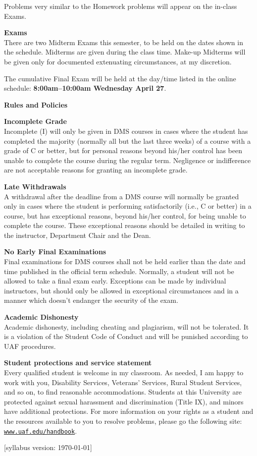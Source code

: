 \documentclass[12pt]{article}
\renewcommand{\emph}[1]{\textsf{\textbf{#1}}}
\newcommand{\localhead}[1]{\par\smallskip\textbf{#1} \smallskip\nobreak\\}%
\def\heading#1{\localhead{\large\emph{#1}}}
\def\subheading#1{\localhead{\emph{#1}}}
\begin{document}
Problems very similar to the Homework problems will appear on the in-class Exams.


\heading{Exams}
There are two Midterm Exams this semester, to be held on the dates shown in the schedule.  Midterms are given during the class time.  Make-up Midterms will be given only for documented extenuating circumstances, at my discretion.

The cumulative Final Exam will be held at the day/time listed in the online schedule: \textbf{8:00am--10:00am Wednesday April 27}.


\heading{Rules and Policies}
\vskip -20pt

\subheading{Incomplete Grade} 
Incomplete (I) will only be given in
  DMS courses in cases where
  the student has completed the majority (normally all but the last
  three weeks) of a course with a grade of C or better, but for
  personal reasons beyond his/her control has been unable to complete
  the course during the regular term. Negligence or indifference are
  not acceptable reasons for granting an incomplete grade.

\subheading{Late Withdrawals} 
A withdrawal after the deadline from a DMS course will
  normally be granted only in cases where the student is performing
  satisfactorily (i.e., C or better) in a course, but has exceptional
  reasons, beyond his/her control, for being unable to complete the
  course.  These exceptional reasons should be detailed in writing to
  the instructor, Department Chair and the Dean.

\subheading{No Early Final Examinations}
Final examinations for DMS
  courses shall not be held earlier than the date and time published
  in the official term schedule. Normally, a student will not be
  allowed to take a final exam early. Exceptions can be made by
  individual instructors, but should only be allowed in exceptional
  circumstances and in a manner which doesn't endanger the security of
  the exam.

\subheading{Academic Dishonesty}
Academic dishonesty, including cheating and plagiarism, will not be tolerated.  It is a violation of the Student Code of Conduct and will be punished according to UAF procedures.

\subheading{Student protections and service statement}
Every qualified student is welcome in my classroom.  As needed, I am happy to work with you, Disability Services, Veterans' Services, Rural Student Services, and so on, to find reasonable accommodations.  Students at this University are protected against sexual harassment and discrimination (Title IX), and minors have additional protections.  For more information on your rights as a student and the resources available to you to resolve problems, please go the following site: \href{https://www.uaf.edu/handbook/}{\texttt{www.uaf.edu/handbook}}.

\hfill  \scriptsize [syllabus version: \today] \normalsize
\end{document}
